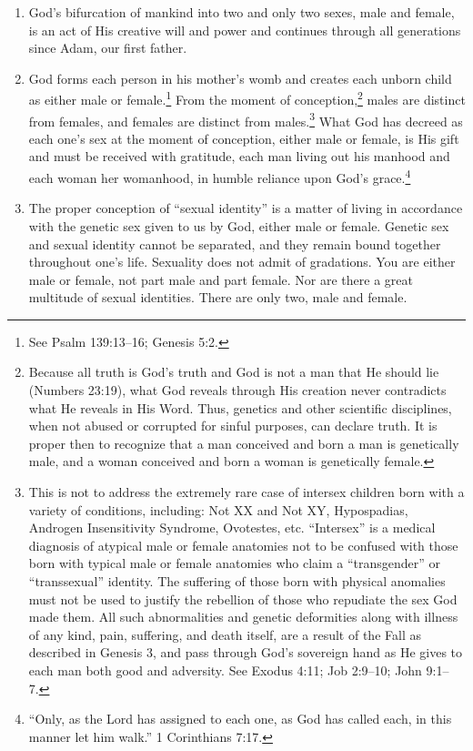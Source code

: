 \documentclass[
]{book}
\begin{document}
\begin{enumerate}
\def\labelenumi{\arabic{enumi}.}
\setcounter{enumi}{4}
\item
  God's bifurcation of mankind into two and only two sexes, male and female, is an act of His creative will and power and continues through all generations since Adam, our first father.
\item
  God forms each person in his mother's womb and creates each unborn child as either male or female.\footnote{See Psalm 139:13--16; Genesis 5:2.} From the moment of conception,\footnote{Because all truth is God's truth and God is not a man that He should lie (Numbers 23:19), what God reveals through His creation never contradicts what He reveals in His Word. Thus, genetics and other scientific disciplines, when not abused or corrupted for sinful purposes, can declare truth. It is proper then to recognize that a man conceived and born a man is genetically male, and a woman conceived and born a woman is genetically female.} males are distinct from females, and females are distinct from males.\footnote{This is not to address the extremely rare case of intersex children born with a variety of conditions, including: Not XX and Not XY, Hypospadias, Androgen Insensitivity Syndrome, Ovotestes, etc. ``Intersex'' is a medical diagnosis of atypical male or female anatomies not to be confused with those born with typical male or female anatomies who claim a ``transgender'' or ``transsexual'' identity. The suffering of those born with physical anomalies must not be used to justify the rebellion of those who repudiate the sex God made them. All such abnormalities and genetic deformities along with illness of any kind, pain, suffering, and death itself, are a result of the Fall as described in Genesis 3, and pass through God's sovereign hand as He gives to each man both good and adversity. See Exodus 4:11; Job 2:9--10; John 9:1--7.} What God has decreed as each one's sex at the moment of conception, either male or female, is His gift and must be received with gratitude, each man living out his manhood and each woman her womanhood, in humble reliance upon God's grace.\footnote{``Only, as the Lord has assigned to each one, as God has called each, in this manner let him walk.'' 1 Corinthians 7:17.}
\item
  The proper conception of ``sexual identity'' is a matter of living in accordance with the genetic sex given to us by God, either male or female. Genetic sex and sexual identity cannot be separated, and they remain bound together throughout one's life. Sexuality does not admit of gradations. You are either male or female, not part male and part female. Nor are there a great multitude of sexual identities. There are only two, male and female.

\end{enumerate}
\end{document}
